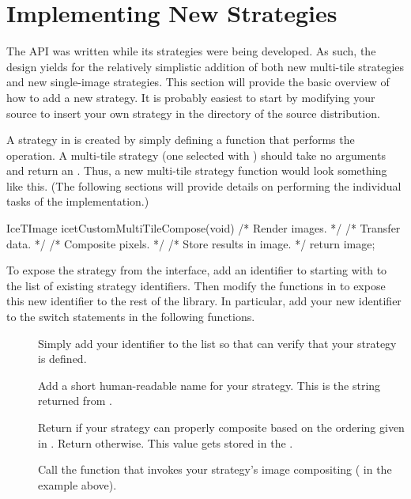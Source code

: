 \section{Implementing New Strategies}

The \IceT API was written while its strategies were being developed.  As
such, the design yields for the relatively simplistic addition of both new
multi-tile strategies and new single-image strategies.  This section will
provide the basic overview of how to add a new strategy.  It is probably
easiest to start by modifying your \IceT source to insert your own strategy
in the  directory of the \IceT source distribution.

A strategy in \IceT is created by simply defining a function that performs
the operation.  A multi-tile strategy (one selected with
) should take no arguments and return an
.  Thus, a new multi-tile strategy function would look
something like this.  (The following sections will provide details on
performing the individual tasks of the implementation.)

\begin{code}
IceTImage icetCustomMultiTileCompose(void)
{
    /* Render images. */
    /* Transfer data. */
    /* Composite pixels. */
    /* Store results in image. */
    return image;
}
\end{code}

To expose the strategy from the \IceT interface, add an identifier to
 starting with  to the list of
existing strategy identifiers.  Then modify the functions in
 to expose this new identifier to the rest
of the \IceT library.  In particular, add your new identifier to the switch
statements in the following functions.

\begin{description}
\item[] Simply add your identifier to the list so
  that \IceT can verify that your strategy is defined.
\item[] Add a short human-readable name for
  your strategy.  This is the string returned from
  .
\item[] Return  if your
  strategy can properly composite based on the ordering given in
  .  Return  otherwise.
  This value gets stored in the
  .
\item[] Call the function that invokes your
  strategy's image compositing ( in the
  example above).
\end{description}

